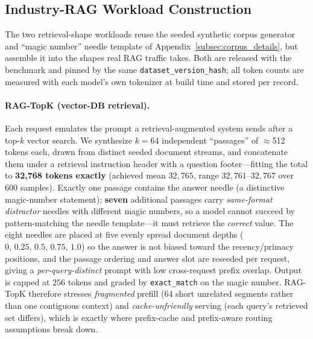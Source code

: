 \subsection{Industry-RAG Workload Construction}
\label{subsec:rag_details}
The two retrieval-shape workloads reuse the seeded synthetic corpus generator and
``magic number'' needle template of Appendix~\ref{subsec:corpus_details}, but
assemble it into the shapes real RAG traffic takes. Both are released with the
benchmark and pinned by the same \texttt{dataset\_version\_hash}; all token counts
are measured with each model's own tokenizer at build time and stored per record.

\paragraph{RAG-TopK (vector-DB retrieval).}
Each request emulates the prompt a retrieval-augmented system sends after a top-$k$
vector search. We synthesize $k{=}64$ independent ``passages'' of $\approx$512
tokens each, drawn from distinct seeded document streams, and concatenate them under
a retrieval instruction header with a question footer---fitting the total to
\textbf{32{,}768 tokens exactly} (achieved mean $32{,}765$, range $32{,}761$--$32{,}767$
over $600$ samples). Exactly one passage contains the answer needle (a distinctive
magic-number statement); \textbf{seven} additional passages carry \emph{same-format
distractor} needles with different magic numbers, so a model cannot succeed by
pattern-matching the needle template---it must retrieve the \emph{correct} value.
The eight needles are placed at five evenly spread document depths
($0,\,0.25,\,0.5,\,0.75,\,1.0$) so the answer is not biased toward the
recency/primacy positions, and the passage ordering and answer slot are reseeded
per request, giving a \emph{per-query-distinct} prompt with low cross-request prefix
overlap. Output is capped at $256$ tokens and graded by \texttt{exact\_match} on the
magic number. RAG-TopK therefore stresses \emph{fragmented} prefill (64 short
unrelated segments rather than one contiguous context) and \emph{cache-unfriendly}
serving (each query's retrieved set differs), which is exactly where prefix-cache
and prefix-aware routing assumptions break down.

